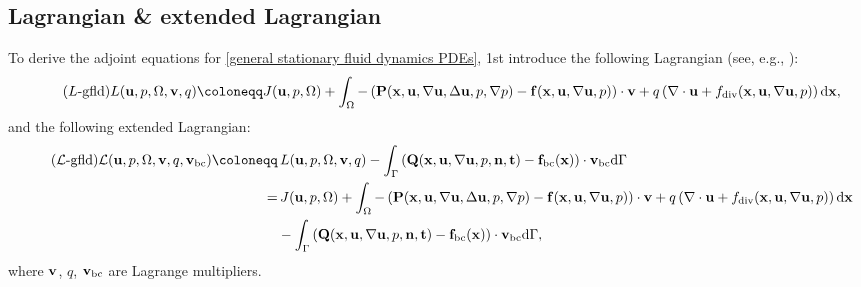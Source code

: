 \documentclass[oneside,11pt]{book}
\numberwithin{equation}{section}
\begin{document}
\subsection{Lagrangian \& extended Lagrangian}
To derive the adjoint equations for \eqref{general stationary fluid dynamics PDEs}, 1st introduce the following Lagrangian (see, e.g., \cite{Troltzsch2010}):
\begin{align}
    \label{Lagrangian for general stationary fluid dynamics PDEs}
    \tag{$L$-gfld}
    L({\bf u},p,\Omega,{\bf v},q)\coloneqq J({\bf u},p,\Omega) + \int_\Omega -\left({\bf P}({\bf x},{\bf u},\nabla{\bf u},\Delta{\bf u},p,\nabla p) - {\bf f}({\bf x},{\bf u},\nabla{\bf u},p)\right)\cdot{\bf v} + q\left(\nabla\cdot{\bf u} + f_{\rm div}({\bf x},{\bf u},\nabla{\bf u},p)\right){\rm d}{\bf x},
\end{align}
and the following extended Lagrangian:
\begin{align}
    \label{extended Lagrangian for general stationary fluid dynamics PDEs}
    \tag{$\mathcal{L}$-gfld}
    \mathcal{L}({\bf u},p,\Omega,{\bf v},q,{\bf v}_{\rm bc})\coloneqq&\, L({\bf u},p,\Omega,{\bf v},q)
    - \int_\Gamma \left({\bf Q}({\bf x},{\bf u},\nabla{\bf u},p,{\bf n},{\bf t}) - {\bf f}_{\rm bc}({\bf x})\right)\cdot{\bf v}_{\rm bc}{\rm d}\Gamma\\
    =&\, J({\bf u},p,\Omega) + \int_\Omega -\left({\bf P}({\bf x},{\bf u},\nabla{\bf u},\Delta{\bf u},p,\nabla p) - {\bf f}({\bf x},{\bf u},\nabla{\bf u},p)\right)\cdot{\bf v} + q\left(\nabla\cdot{\bf u} + f_{\rm div}({\bf x},{\bf u},\nabla{\bf u},p)\right){\rm d}{\bf x}\nonumber\\
    &- \int_\Gamma \left({\bf Q}({\bf x},{\bf u},\nabla{\bf u},p,{\bf n},{\bf t}) - {\bf f}_{\rm bc}({\bf x})\right)\cdot{\bf v}_{\rm bc}{\rm d}\Gamma,\nonumber
\end{align}
where ${\bf v}$, $q$, ${\bf v}_{\rm bc}$ are Lagrange multipliers.
\end{document}
